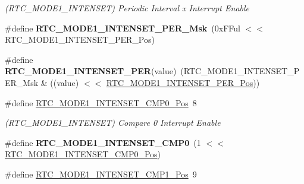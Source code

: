 \begin{DoxyCompactItemize}
\begin{DoxyCompactList}\small\item\em (R\+T\+C\+\_\+\+M\+O\+D\+E1\+\_\+\+I\+N\+T\+E\+N\+S\+E\+T) Periodic Interval x Interrupt Enable \end{DoxyCompactList}\item 
\hypertarget{group___s_a_m_l21___r_t_c_gad290f078dbc91750fc43ce53896b4db5}{}\#define {\bfseries R\+T\+C\+\_\+\+M\+O\+D\+E1\+\_\+\+I\+N\+T\+E\+N\+S\+E\+T\+\_\+\+P\+E\+R\+\_\+\+Msk}~(0x\+F\+Ful $<$$<$ R\+T\+C\+\_\+\+M\+O\+D\+E1\+\_\+\+I\+N\+T\+E\+N\+S\+E\+T\+\_\+\+P\+E\+R\+\_\+\+Pos)\label{group___s_a_m_l21___r_t_c_gad290f078dbc91750fc43ce53896b4db5}

\item 
\hypertarget{group___s_a_m_l21___r_t_c_gab4bea3df35d293ea9d80563b14bfb27b}{}\#define {\bfseries R\+T\+C\+\_\+\+M\+O\+D\+E1\+\_\+\+I\+N\+T\+E\+N\+S\+E\+T\+\_\+\+P\+E\+R}(value)~(R\+T\+C\+\_\+\+M\+O\+D\+E1\+\_\+\+I\+N\+T\+E\+N\+S\+E\+T\+\_\+\+P\+E\+R\+\_\+\+Msk \& ((value) $<$$<$ \hyperlink{group___s_a_m_l21___r_t_c_gadc85bf7bba06261945c6e162c43018e0}{R\+T\+C\+\_\+\+M\+O\+D\+E1\+\_\+\+I\+N\+T\+E\+N\+S\+E\+T\+\_\+\+P\+E\+R\+\_\+\+Pos}))\label{group___s_a_m_l21___r_t_c_gab4bea3df35d293ea9d80563b14bfb27b}

\item 
\hypertarget{group___s_a_m_l21___r_t_c_ga7830610a722eb45838faf424c4f16808}{}\#define \hyperlink{group___s_a_m_l21___r_t_c_ga7830610a722eb45838faf424c4f16808}{R\+T\+C\+\_\+\+M\+O\+D\+E1\+\_\+\+I\+N\+T\+E\+N\+S\+E\+T\+\_\+\+C\+M\+P0\+\_\+\+Pos}~8\label{group___s_a_m_l21___r_t_c_ga7830610a722eb45838faf424c4f16808}

\begin{DoxyCompactList}\small\item\em (R\+T\+C\+\_\+\+M\+O\+D\+E1\+\_\+\+I\+N\+T\+E\+N\+S\+E\+T) Compare 0 Interrupt Enable \end{DoxyCompactList}\item 
\hypertarget{group___s_a_m_l21___r_t_c_ga155e51a9228b8d7ffcf5f01dcafb463d}{}\#define {\bfseries R\+T\+C\+\_\+\+M\+O\+D\+E1\+\_\+\+I\+N\+T\+E\+N\+S\+E\+T\+\_\+\+C\+M\+P0}~(1 $<$$<$ \hyperlink{group___s_a_m_l21___r_t_c_ga7830610a722eb45838faf424c4f16808}{R\+T\+C\+\_\+\+M\+O\+D\+E1\+\_\+\+I\+N\+T\+E\+N\+S\+E\+T\+\_\+\+C\+M\+P0\+\_\+\+Pos})\label{group___s_a_m_l21___r_t_c_ga155e51a9228b8d7ffcf5f01dcafb463d}

\item 
\hypertarget{group___s_a_m_l21___r_t_c_gae7b781ed1f8cffb051ad9fba877630f0}{}\#define \hyperlink{group___s_a_m_l21___r_t_c_gae7b781ed1f8cffb051ad9fba877630f0}{R\+T\+C\+\_\+\+M\+O\+D\+E1\+\_\+\+I\+N\+T\+E\+N\+S\+E\+T\+\_\+\+C\+M\+P1\+\_\+\+Pos}~9\label{group___s_a_m_l21___r_t_c_gae7b781ed1f8cffb051ad9fba877630f0}


\end{DoxyCompactItemize}
